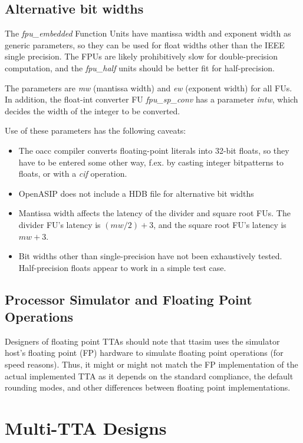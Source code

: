 \documentclass[a4paper,twoside]{tceusermanual}
\begin{document}
\subsection{Alternative bit widths}

The \emph{fpu\_embedded} Function Units have mantissa width and exponent width as generic 
parameters, so they can be used for float widths other than the IEEE single precision. 
The FPUs are likely prohibitively slow for double-precision computation, and the \emph{fpu\_half} units
should be better fit for half-precision.

The parameters are \emph{mw} (mantissa width) and \emph{ew} (exponent width) for all FUs. In addition, the float-int converter FU 
\emph{fpu\_sp\_conv} has a parameter \emph{intw}, which decides the width of the integer to be 
converted.

Use of these parameters has the following caveats:

\begin{itemize}
    \item The oacc compiler converts floating-point literals into 32-bit floats, so they have to be entered some other way, f.ex. by casting integer bitpatterns to floats, or with a \emph{cif} operation.
    \item OpenASIP does not include a HDB file for alternative bit widths
    \item Mantissa width affects the latency of the divider and square root FUs. The divider FU's latency is $(mw/2)+3$, and the square root FU's latency is $mw+3$.
    \item Bit widths other than single-precision have not been exhaustively tested. Half-precision floats appear to work in a simple test case.
\end{itemize}

\subsection{Processor Simulator and Floating Point Operations}

Designers of floating point TTAs should note that ttasim uses the simulator 
host's floating point (FP) hardware to simulate floating point operations (for 
speed reasons). Thus, it might or might not match the FP implementation of 
the actual implemented TTA as it depends on the standard compliance, the
default rounding modes, and other differences between floating point 
implementations.

\section{Multi-TTA Designs}
\end{document}

